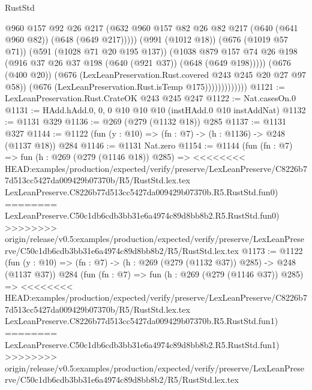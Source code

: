 \begin{lexlean}{RustStd}
\begin{coremodule}
{\begin{coremodule}
{{{{{{                                @960
                                @157
                                @92
                                @26
                                @217
                                (@632
                                  @960
                                  @157
                                  @82
                                  @26
                                  @82
                                  @217
                                  (@640 (@641 @960 @82))
                                  (@648 (@649 @217)))))
                            (@991 (@1012 @18))
                            (@676 (@1019 @57 @71))
                            (@591 (@1028 @71 @20 @195 @137))
                            (@1038
                              @879
                              @157
                              @74
                              @26
                              @198
                              (@916 @37 @26 @37 @198 (@640 (@921 @37)) (@648 (@649 @198)))))
                          (@676 (@400 @20))
                          (@676 (LexLeanPreservation.Rust.covered @243 @245 @20 @27 @97 @58))
                          (@676 (LexLeanPreservation.Rust.isTemp @175)))))))))))))
@1121 := LexLeanPreservation.Rust.CrateOK @243 @245 @247
@1122 := Nat.casesOn.{0}
@1131 := HAdd.hAdd.{0, 0, 0} @10 @10 @10 (instHAdd.{0} @10 instAddNat)
@1132 := @1131 @329
@1136 := @269 (@279 (@1132 @18)) @285
@1137 := @1131 @327
@1144 := @1122 (fun (y : @10) => (fn : @7) -> (h : @1136) -> @248 (@1137 @18)) @284
@1146 := @1131 Nat.zero
@1154 := @1144
    (fun (fn : @7) =>
    fun (h : @269 (@279 (@1146 @18)) @285) =>
<<<<<<<< HEAD:examples/production/expected/verify/preserve/LexLeanPreserve/C8226b77d513cc5427da009429b07370b/R5/RustStd.lex.tex
    LexLeanPreserve.C8226b77d513cc5427da009429b07370b.R5.RustStd.fun0)
========
    LexLeanPreserve.C50c1db6cdb3bb31e6a4974c89d8bb8b2.R5.RustStd.fun0)
>>>>>>>> origin/release/v0.5:examples/production/expected/verify/preserve/LexLeanPreserve/C50c1db6cdb3bb31e6a4974c89d8bb8b2/R5/RustStd.lex.tex
@1173 := @1122
    (fun (y : @10) => (fn : @7) -> (h : @269 (@279 (@1132 @37)) @285) -> @248 (@1137 @37))
    @284
    (fun (fn : @7) =>
    fun (h : @269 (@279 (@1146 @37)) @285) =>
<<<<<<<< HEAD:examples/production/expected/verify/preserve/LexLeanPreserve/C8226b77d513cc5427da009429b07370b/R5/RustStd.lex.tex
    LexLeanPreserve.C8226b77d513cc5427da009429b07370b.R5.RustStd.fun1)
========
    LexLeanPreserve.C50c1db6cdb3bb31e6a4974c89d8bb8b2.R5.RustStd.fun1)
>>>>>>>> origin/release/v0.5:examples/production/expected/verify/preserve/LexLeanPreserve/C50c1db6cdb3bb31e6a4974c89d8bb8b2/R5/RustStd.lex.tex
}}}}}}
\end{coremodule}}
\end{coremodule}
\end{lexlean}
